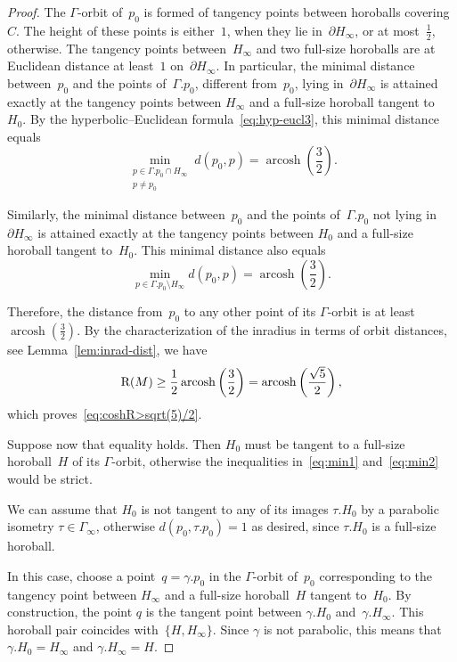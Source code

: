 \documentclass[11pt,reqno]{amsart}
\theoremstyle{definition}
\numberwithin{equation}{section}
\newcommand\RR{{\rm R}}
\DeclareMathOperator{\arcosh}{arcosh}
\numberwithin{equation}{section}
\begin{document}
\begin{proof}
The $\Gamma$-orbit of~$p_0$ is formed of tangency points between horoballs covering~$C$.
The height of these points is either~$1$, when they lie in~$\partial H_\infty$, or at most~$\frac{1}{2}$, otherwise.
The tangency points between~$H_\infty$ and two full-size horoballs are at Euclidean distance at least~$1$ on~$\partial H_\infty$.
In particular, the minimal distance between~$p_0$ and the points of~$\Gamma.p_0$, different from~$p_0$, lying in~$\partial H_\infty$ is attained exactly at the tangency points between $H_\infty$ and a full-size horoball tangent to~$H_0$.
By the hyperbolic--Euclidean formula~\eqref{eq:hyp-eucl3}, this minimal distance equals
\begin{equation} \label{eq:min1}
\min_{\substack{p \in \Gamma.p_0 \cap H_\infty \\ p \neq p_0}} d(p_0,p) = \arcosh \left( \frac{3}{2} \right).
\end{equation}

Similarly, the minimal distance between~$p_0$ and the points of~$\Gamma.p_0$ not lying in~$\partial H_\infty$ is attained exactly at the tangency points between $H_0$ and a full-size horoball tangent to~$H_0$.
This minimal distance also equals
\begin{equation} \label{eq:min2}
\min_{p \in \Gamma.p_0 \setminus H_\infty} d(p_0,p) = \arcosh \left( \frac{3}{2} \right).
\end{equation}

Therefore, the distance from~$p_0$ to any other point of its $\Gamma$-orbit is at least $\arcosh( \frac{3}{2} )$.
By the characterization of the inradius in terms of orbit distances, see Lemma~\ref{lem:inrad-dist}, we have
\[
\RR(M) \geq \frac{1}{2} \arcosh \left( \frac{3}{2} \right) = \arcosh \left( \frac{\sqrt{5}}{2} \right),
\]
which proves~\eqref{eq:coshR>sqrt(5)/2}.

Suppose now that equality holds.
Then $H_0$ must be tangent to a full-size horoball~$H$ of its $\Gamma$-orbit, otherwise the inequalities in~\eqref{eq:min1} and~\eqref{eq:min2} would be strict.

We can assume that $H_0$ is not tangent to any of its images $\tau.H_0$ by a parabolic isometry $\tau \in \Gamma_\infty$, otherwise $d(p_0,\tau.p_0)=1$ as desired, since $\tau.H_0$ is a full-size horoball.

In this case, choose a point~$q=\gamma.p_0$ in the $\Gamma$-orbit of~$p_0$ corresponding to the tangency point between $H_\infty$ and a full-size horoball~$H$ tangent to~$H_0$.
By construction, the point $q$ is the tangent point between $\gamma.H_0$ and~$\gamma.H_\infty$.
This horoball pair coincides with~$\{H, H_\infty\}$.
Since $\gamma$ is not parabolic, this means that $\gamma.H_0=H_\infty$ and $\gamma.H_\infty=H$.


\end{proof}
\end{document}
